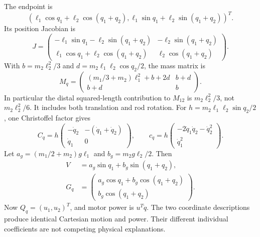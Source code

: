 The endpoint is
\begin{equation}
(\ell_1\cos q_1+\ell_2\cos(q_1+q_2),\ell_1\sin q_1+\ell_2\sin(q_1+q_2))^T.
\end{equation}
 Its position Jacobian is
\begin{equation}
J=\begin{pmatrix}
-\ell_1\sin q_1-\ell_2\sin(q_1+q_2)&-\ell_2\sin(q_1+q_2)\\
\ell_1\cos q_1+\ell_2\cos(q_1+q_2)&\ell_2\cos(q_1+q_2)
\end{pmatrix}.
\label{eq:lagrangian_arm_jacobian}
\end{equation}
With $b=m_2\ell_2^2/3$ and $d=m_2\ell_1\ell_2\cos q_2/2$, the mass matrix is
\begin{equation}
M_q=\begin{pmatrix}
(m_1/3+m_2)\ell_1^2+b+2d&b+d\\
b+d&b
\end{pmatrix}.
\label{eq:lagrangian_arm_mass}
\end{equation}
In particular the distal squared-length contribution to $M_{12}$ is $m_2\ell_2^2/3$, not $m_2\ell_2^2/6$. It includes both translation and rod rotation. For $h=m_2\ell_1\ell_2\sin q_2/2$, one Christoffel factor gives
\begin{equation}
C_q=h\begin{pmatrix}-\dot q_2&-(\dot q_1+\dot q_2)\\\dot q_1&0\end{pmatrix},
\qquad
c_q=h\begin{pmatrix}-2\dot q_1\dot q_2-\dot q_2^2\\\dot q_1^2\end{pmatrix}.
\label{eq:lagrangian_arm_bias}
\end{equation}
Let $a_g=(m_1/2+m_2)g\ell_1$ and $b_g=m_2g\ell_2/2$. Then
\begin{equation}
\begin{aligned}
V&=a_g\sin q_1+b_g\sin(q_1+q_2),\\
G_q&=\begin{pmatrix}a_g\cos q_1+b_g\cos(q_1+q_2)\\b_g\cos(q_1+q_2)\end{pmatrix}.
\end{aligned}
\label{eq:lagrangian_arm_gravity}
\end{equation}
Now $Q_q=(u_1,u_2)^T$, and motor power is $u^T\dot q$. The two coordinate descriptions produce identical Cartesian motion and power. Their different individual coefficients are not competing physical explanations.

